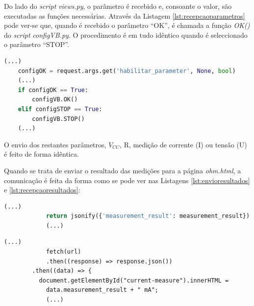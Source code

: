 Do lado do \textit{script} \textit{views.py}, o parâmetro é recebido e, consoante o valor, são executadas as funções necessárias. Através da Listagem \ref{lst:recepcaoparametros} pode ver-se que, quando é recebido o parâmetro ``OK'', é chamada a função \textit{OK()} do \textit{script} \textit{configVB.py}. O procedimento é em tudo idêntico quando é seleccionado o parâmetro ``STOP''.

\begin{minipage}{0.9\linewidth}
	\begin{lstlisting}[language=python, caption=Recepção de parâmetros enviados de \textit{ohm.html}, label=lst:recepcaoparametros]
	(...)
	configOK = request.args.get('habilitar_parameter', None, bool)
	(...)
	if configOK == True:
        configVB.OK()      
    elif configSTOP == True:
        configVB.STOP()	
	(...)
	\end{lstlisting}
\end{minipage}

O envio dos restantes parâmetros, $V_{CC}$, R, medição de corrente (I) ou tensão (U) é feito de forma idêntica.

Quando se trata de enviar o resultado das medições para a página \textit{ohm.html}, a comunicação é feita da forma como se pode ver nas Listagens \ref{lst:envioresultados} e \ref{lst:recepcaoresultados}:
\begin{center}
	\begin{minipage}{0.7\linewidth}
		\begin{lstlisting}[language=python, caption=Envio de resultados do servidor (\textit{views.py}) para a página \textit{ohm.html}, label=lst:envioresultados]
			(...)
			return jsonify({'measurement_result': measurement_result})
			(...)
	\end{lstlisting}
	\end{minipage}
\end{center}

\begin{center}
	\begin{minipage}{0.7\linewidth}
		\begin{lstlisting}[language=html, caption=Recepção de resultados na página \textit{ohm.html}, label=lst:recepcaoresultados]
			(...)
			fetch(url)
			.then((response) => response.json())
		.then((data) => {
		  document.getElementById("current-measure").innerHTML =
			data.measurement_result + " mA";
			(...)
			\end{lstlisting}
	\end{minipage}
\end{center}

